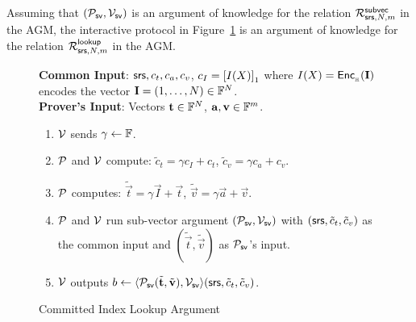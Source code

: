 \begin{lemma}\label{lem:proto-committed-index-lookup}
Assuming that $(\mathcal{P}_{\mathsf{sv}},\mathcal{V}_{\mathsf{sv}})$ is an argument of knowledge for the relation $\mathcal{R}^{\mathsf{subvec}}_{\mathsf{srs},N,m}$ in the AGM, the interactive protocol
in Figure~\ref{fig:committed-index-lookup} is an argument of knowledge for the relation $\mathcal{R}^{\mathsf{lookup}}_{\mathsf{srs},N,m}$ in the AGM.
\end{lemma}

\begin{figure}[tb!]
\begin{mdframed}
{
    {\bf Common Input}: $\mathsf{srs},c_t, c_a, c_v$, $c_I=\left[{I(X)}\right]_1$ where $I(X)=\mathsf{Enc}_{{}_{\mathbb{H}}}(\mathbf{I})$ encodes the vector $\mathbf{I}=(1,\ldots,N)\in\mathbb{F}^N$. \\
    {\bf Prover's Input}: Vectors $\mathbf{t}\in \mathbb{F}^N$, $\mathbf{a},\mathbf{v}\in\mathbb{F}^m$.
    \begin{enumerate}[leftmargin=1em, label=\arabic*.]
    \item $\mathcal{V}$ sends $\gamma\gets \mathbb{F}$.
    \item $\mathcal{P}$ and $\mathcal{V}$ compute: $\tilde{c}_t=\gamma c_I+c_t$, $\tilde{c}_v=\gamma c_a + c_v$.
    \item $\mathcal{P}$ computes: $\tilde{\vec{t}}=\gamma\vec{I} + \vec{t}$, $\tilde{\vec{v}}=\gamma\vec{a} + \vec{v}$.
    \item $\mathcal{P}$ and $\mathcal{V}$ run sub-vector argument $(\mathcal{P}_{\mathsf{sv}},\mathcal{V}_{\mathsf{sv}})$ with
    $(\mathsf{srs},\tilde{c}_t,\tilde{c}_v)$ as the common input and $(\tilde{\vec{t}},\tilde{\vec{v}})$ as $\mathcal{P}_{\mathsf{sv}}$'s input.
    \item $\mathcal{V}$ outputs
    $b\gets \langle {\ensuremath{\mathcal{P}}_{\mathsf{sv}}}({\tilde{\mathbf{t}},\tilde{\mathbf{v}}}), {\mathcal{V}_{\mathsf{sv}}}\rangle({\mathsf{srs},\tilde{c}_t,\tilde{c}_v})$.
    \end{enumerate}
}
\end{mdframed}
\caption{Committed Index Lookup Argument}
\label{fig:committed-index-lookup}
\end{figure}

